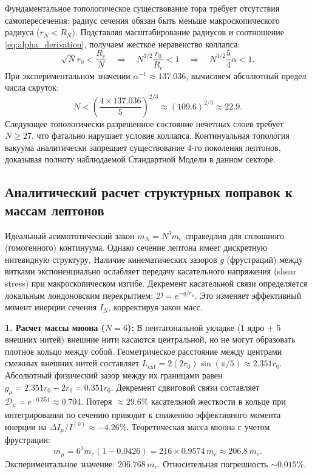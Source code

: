 \documentclass[12pt,a4paper]{article}
\begin{document}
Фундаментальное топологическое существование тора требует отсутствия самопересечения: радиус сечения обязан быть меньше макроскопического радиуса ($r_N < R_N$). Подставляя масштабирование радиусов и соотношение \eqref{eq:alpha_derivation}, получаем жесткое неравенство коллапса:
\begin{equation}
\sqrt{N} r_0 < \frac{R_e}{N} \quad \Longrightarrow \quad N^{3/2} \frac{r_0}{R_e} < 1 \quad \Longrightarrow \quad N^{3/2} \frac{5}{4}\alpha < 1.
\end{equation}
При экспериментальном значении $\alpha^{-1} \approx 137.036$, вычисляем абсолютный предел числа скруток:
\begin{equation}
N < \left( \frac{4 \times 137.036}{5} \right)^{2/3} \approx (109.6)^{2/3} \approx 22.9.
\end{equation}
Следующее топологически разрешенное состояние нечетных слоев требует $N \ge 27$, что фатально нарушает условие коллапса. Континуальная топология вакуума аналитически запрещает существование 4-го поколения лептонов, доказывая полноту наблюдаемой Стандартной Модели в данном секторе.
	
\subsection{Аналитический расчет структурных поправок к массам лептонов}
Идеальный асимптотический закон $m_N = N^3 m_e$ справедлив для сплошного (гомогенного) континуума. Однако сечение лептона имеет дискретную нитевидную структуру. Наличие кинематических зазоров $g$ (фрустраций) между витками экспоненциально ослабляет передачу касательного напряжения (shear stress) при макроскопическом изгибе. Декремент касательной связи определяется локальным лондоновским перекрытием: $\mathcal{D} = e^{-g / r_0}$. Это изменяет эффективный момент инерции сечения $I_N$, корректируя закон масс.
	
\textbf{1. Расчет массы мюона ($N=6$):} 
В пентагональной укладке (1 ядро + 5 внешних нитей) внешние нити касаются центральной, но не могут образовать плотное кольцо между собой. Геометрическое расстояние между центрами смежных внешних нитей составляет $L_{\text{ext}} = 2(2r_0) \sin(\pi/5) \approx 2.351 r_0$. Абсолютный физический зазор между их границами равен $g_\mu = 2.351 r_0 - 2 r_0 = 0.351 r_0$. 
Декремент сдвиговой связи составляет $\mathcal{D}_\mu = e^{-0.351} \approx 0.704$. 
Потеря $\approx 29.6\%$ касательной жесткости в кольце при интегрировании по сечению приводит к снижению эффективного момента инерции на $\Delta I_\mu / I^{(0)} \approx -4.26\%$. 
Теоретическая масса мюона с учетом фрустрации:
\begin{equation}
m_\mu = 6^3 m_e (1 - 0.0426) = 216 \times 0.9574 \, m_e \approx 206.8 \, m_e.
\end{equation}
Экспериментальное значение: $206.768 \, m_e$. Относительная погрешность $\sim 0.015\%$.
	
\end{document}
